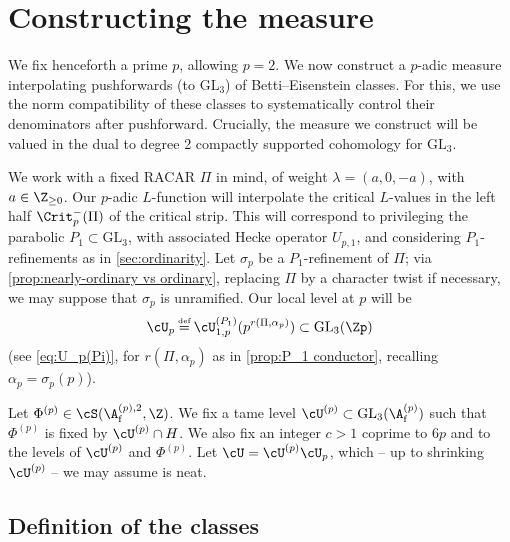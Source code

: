 \documentclass[10pt,reqno,a4paper]{amsart}
\newcommand{\subf}{_{\mathrm{f}}}
\newcommand{\GL}{\mathrm{GL}}
\begin{document}

\section{Constructing the measure}\label{sec:construction}


We fix henceforth a prime $p$, allowing $p = 2$.
We now construct a $p$-adic measure interpolating pushforwards (to $\GL_3$) of Betti--Eisenstein classes. For this, we use the norm compatibility of these classes to systematically control their denominators after pushforward. Crucially, the measure we construct will be valued in the dual to degree 2 compactly supported cohomology for $\GL_3$.


\begin{notation}\label{not:construction}
We work with a fixed RACAR $\Pi$ in mind, of weight $\lambda = (a,0,-a)$, with $a \in \Z_{\geq 0}$. Our $p$-adic $L$-function will interpolate the critical $L$-values in the left half $\Crit_p^-(\Pi)$ of the critical strip. This will correspond to privileging the parabolic $P_1 \subset \GL_3$, with associated Hecke operator $U_{p,1}$, and considering $P_1$-refinements as in \cref{sec:ordinarity}. Let $\sigma_p$ be a $P_1$-refinement of $\Pi$; via \cref{prop:nearly-ordinary vs ordinary}, replacing $\Pi$ by a character twist if necessary, we may suppose that $\sigma_p$ is unramified. Our local level at $p$ will be
\begin{equation}\label{eq:U_p measure}
\cU_p \defeq \cU_{1,p}^{(P_1)}(p^{r(\Pi,\alpha_p)}) \subset \GL_3(\Zp)
\end{equation}
(see \eqref{eq:U_p(Pi)}, for $r(\Pi,\alpha_p)$ as in \cref{prop:P_1 conductor}, recalling $\alpha_p = \sigma_p(p)$).


Let $\Phi^{(p)} \in \cS(\A\subf^{(p),2},\Z)$. We fix a tame level $\cU^{(p)} \subset \GL_3(\A\subf^{(p)})$ such that $\Phi^{(p)}$ is fixed by $\cU^{(p)}\cap H$. We also fix an integer $c > 1$ coprime to $6p$ and to the levels of $\cU^{(p)}$ and $\Phi^{(p)}$. Let $\cU = \cU^{(p)}\cU_p$, which -- up to shrinking $\cU^{(p)}$ -- we may assume is neat.
\end{notation}






\subsection{Definition of the classes}\label{sec:define classes}
\end{document}
